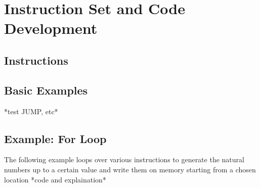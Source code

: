 \section{Instruction Set and Code Development} \label{sec:code}
\subsection{Instructions}
\subsection{Basic Examples}
*test JUMP, etc*
\subsection{Example: For Loop}  \label{ssec:laser_technology}
The following example loops over various instructions to generate the
natural numbers up to a certain value  and write them on memory starting from a chosen location
*code and explaination*